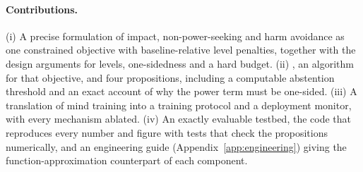 \paragraph{Contributions.}
(i) A precise formulation of impact, non-power-seeking and harm avoidance as one constrained objective with baseline-relative level penalties, together with the design arguments for levels, one-sidedness and a hard budget.
(ii) \BRAG{}, an algorithm for that objective, and four propositions, including a computable abstention threshold and an exact account of why the power term must be one-sided.
(iii) A translation of mind training into a training protocol and a deployment monitor, with every mechanism ablated.
(iv) An exactly evaluable testbed, the code that reproduces every number and figure with tests that check the propositions numerically, and an engineering guide (Appendix~\ref{app:engineering}) giving the function-approximation counterpart of each component.
